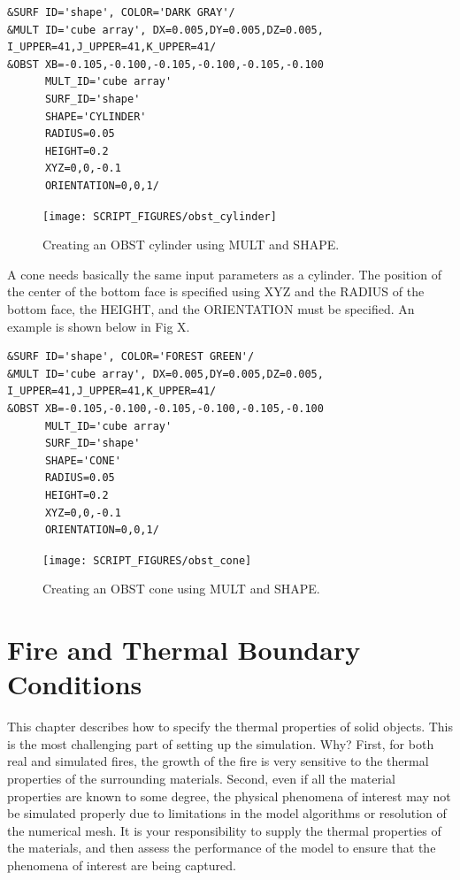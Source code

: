 \documentclass[11pt]{book}
\begin{document}
\begin{lstlisting}
&SURF ID='shape', COLOR='DARK GRAY'/
&MULT ID='cube array', DX=0.005,DY=0.005,DZ=0.005, I_UPPER=41,J_UPPER=41,K_UPPER=41/
&OBST XB=-0.105,-0.100,-0.105,-0.100,-0.105,-0.100
      MULT_ID='cube array'
      SURF_ID='shape'
      SHAPE='CYLINDER'
      RADIUS=0.05
      HEIGHT=0.2
      XYZ=0,0,-0.1
      ORIENTATION=0,0,1/
\end{lstlisting}

\begin{figure}[ht]
\centering
\texttt{[image: SCRIPT\_FIGURES/obst\_cylinder]}
\caption[Creating an {\ct OBST} cylinder using {\ct MULT} and {\ct SHAPE}]{Creating an {\ct OBST} cylinder using {\ct MULT} and {\ct SHAPE}.}
\label{fig:obst_cylinder}
\end{figure}

A cone needs basically the same input parameters as a cylinder.  The position of the center of the bottom face is specified using {\ct XYZ} and the {\ct RADIUS} of the bottom face, the {\ct HEIGHT}, and the {\ct ORIENTATION} must be specified.  An example is shown below in Fig X.

\begin{lstlisting}
&SURF ID='shape', COLOR='FOREST GREEN'/
&MULT ID='cube array', DX=0.005,DY=0.005,DZ=0.005, I_UPPER=41,J_UPPER=41,K_UPPER=41/
&OBST XB=-0.105,-0.100,-0.105,-0.100,-0.105,-0.100
      MULT_ID='cube array'
      SURF_ID='shape'
      SHAPE='CONE'
      RADIUS=0.05
      HEIGHT=0.2
      XYZ=0,0,-0.1
      ORIENTATION=0,0,1/
\end{lstlisting}

\begin{figure}[ht]
\centering
\texttt{[image: SCRIPT\_FIGURES/obst\_cone]}
\caption[Creating an {\ct OBST} cone using {\ct MULT} and {\ct SHAPE}]{Creating an {\ct OBST} cone using {\ct MULT} and {\ct SHAPE}.}
\label{fig:obst_cone}
\end{figure}



\chapter{Fire and Thermal Boundary Conditions}

This chapter describes how to specify the thermal properties of solid objects. This is
the most challenging part of setting up the simulation. Why?  First,
for both real and simulated fires, the growth of the fire is very
sensitive to the thermal properties of the surrounding
materials. Second, even if all the material properties are known to
some degree, the physical phenomena of interest may not be simulated
properly due to limitations in the model algorithms or resolution of
the numerical mesh. It is your responsibility to supply the thermal
properties of the materials, and then assess the performance of the
model to ensure that the phenomena of interest are being captured.
\end{document}
